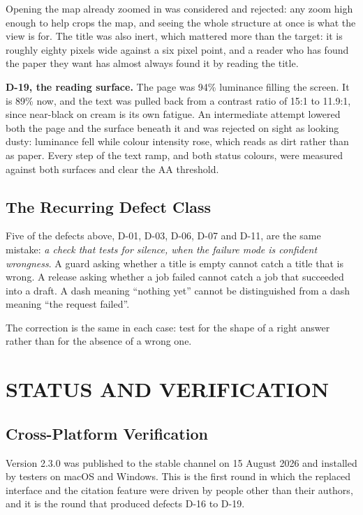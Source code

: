 \documentclass[12pt,a4paper]{report}
\begin{document}
Opening the map already zoomed in was considered and rejected: any zoom high
enough to help crops the map, and seeing the whole structure at once is what
the view is for. The title was also inert, which mattered more than the target:
it is roughly eighty pixels wide against a six pixel point, and a reader who
has found the paper they want has almost always found it by reading the title.

\textbf{D-19, the reading surface.} The page was 94\% luminance filling the
screen. It is 89\% now, and the text was pulled back from a contrast ratio of
15:1 to 11.9:1, since near-black on cream is its own fatigue. An intermediate
attempt lowered both the page and the surface beneath it and was rejected on
sight as looking dusty: luminance fell while colour intensity rose, which reads
as dirt rather than as paper. Every step of the text ramp, and both status
colours, were measured against both surfaces and clear the AA threshold.

\section{The Recurring Defect Class}

Five of the defects above, D-01, D-03, D-06, D-07 and D-11, are the same
mistake: \emph{a check that tests for silence, when the failure mode is
confident wrongness}. A guard asking whether a title is empty cannot catch a
title that is wrong. A release asking whether a job failed cannot catch a job
that succeeded into a draft. A dash meaning ``nothing yet'' cannot be
distinguished from a dash meaning ``the request failed''.

The correction is the same in each case: test for the shape of a right answer
rather than for the absence of a wrong one.

\chapter{STATUS AND VERIFICATION}

\section{Cross-Platform Verification}\label{sec:platforms}

Version 2.3.0 was published to the stable channel on 15 August 2026 and
installed by testers on macOS and Windows. This is the first round in which
the replaced interface and the citation feature were driven by people other
than their authors, and it is the round that produced defects D-16 to D-19.
\end{document}
